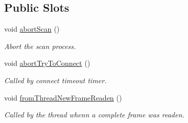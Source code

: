 \subsection*{Public Slots}
\begin{DoxyCompactItemize}
\item 
void \hyperlink{classmdt_modbus_tcp_port_manager_ab6cc6b2a57c1c126be0a9c3142a6f0e5}{abort\-Scan} ()
\begin{DoxyCompactList}\small\item\em Abort the scan process. \end{DoxyCompactList}\item 
void \hyperlink{classmdt_modbus_tcp_port_manager_a4d16b312f74974d4147d631b425771e4}{abort\-Try\-To\-Connect} ()
\begin{DoxyCompactList}\small\item\em Called by connect timeout timer. \end{DoxyCompactList}\item 
void \hyperlink{classmdt_modbus_tcp_port_manager_ad941ea607f00db54aa6deb2866a539e9}{from\-Thread\-New\-Frame\-Readen} ()
\begin{DoxyCompactList}\small\item\em Called by the thread whenn a complete frame was readen. \end{DoxyCompactList}\end{DoxyCompactItemize}
